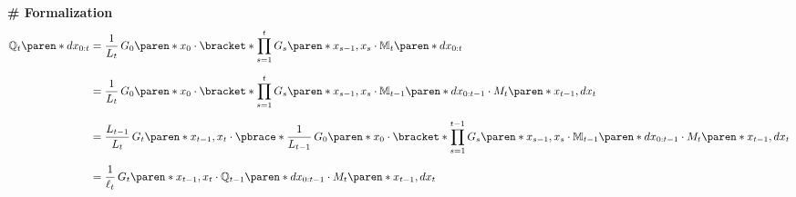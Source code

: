\textbf{\# Formalization}
%
\begin{align}
    \mathbb{Q}_{t} \paren*{dx_{0:t}} &=
        \dfrac{1}{L_{t}} \,
        G_{0} \paren*{x_{0}} \cdot \bracket*{
            \prod_{s = 1}^{{t}} G_{s} \paren*{x_{s - 1}, x_{s}}
        }
        \cdot \mathbb{M}_{t} \paren*{dx_{0:t}}
    \nonumber \\[1.5ex] &=
        \dfrac{1}{L_{t}} \,
        G_{0} \paren*{x_{0}} \cdot \bracket*{
            \prod_{s = 1}^{{t}} G_{s} \paren*{x_{s - 1}, x_{s}}
        }
        \cdot \mathbb{M}_{t-1} \paren*{dx_{0:t-1}} \cdot
        M_{t} \paren*{x_{t-1}, dx_{t}}
    \nonumber \\[1.5ex] &=
        \dfrac{L_{t-1}}{L_{t}} \,
        G_{t} \paren*{x_{t - 1}, x_{t}} \cdot \pbrace*{
            \dfrac{1}{L_{t-1}} \,
            G_{0} \paren*{x_{0}} \cdot \bracket*{
                \prod_{s = 1}^{{t-1}} G_{s} \paren*{x_{s - 1}, x_{s}}
            }
            \cdot \mathbb{M}_{t-1} \paren*{dx_{0:t-1}}
        }
        \cdot M_{t} \paren*{x_{t-1}, dx_{t}}
    \nonumber \\[1.5ex] &=
        \dfrac{1}{\ell_{t}} \,
        G_{t} \paren*{x_{t - 1}, x_{t}}
        \cdot \mathbb{Q}_{t-1} \paren*{dx_{0:t-1}}
        \cdot M_{t} \paren*{x_{t-1}, dx_{t}}
        \label{appendix.eq.forward-recursion.formalization}
\end{align}